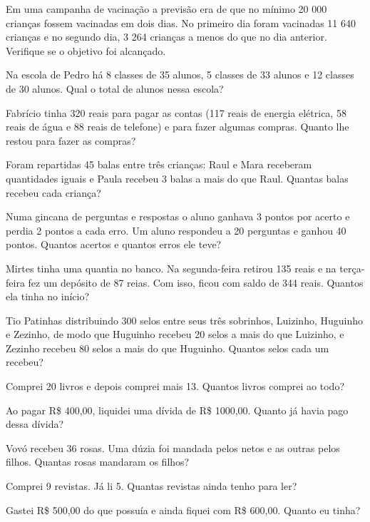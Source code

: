 	\item Em uma campanha de vacinação a previsão era de que no mínimo 20 000 crianças fossem vacinadas em dois dias. No primeiro dia foram vacinadas 11 640 crianças e no segundo dia, 3 264 crianças a menos do que no dia anterior. Verifique se o objetivo foi alcançado.
	\item Na escola de Pedro há 8 classes de 35 alunos, 5 classes de 33 alunos e 12 classes de  30 alunos. Qual o total de alunos nessa escola?
	\item Fabrício tinha 320 reais para pagar as contas (117 reais de energia elétrica, 58 reais de água e 88 reais de telefone) e para fazer algumas compras. Quanto lhe restou para fazer as compras?
	\item Foram repartidas 45 balas entre três crianças: Raul e Mara receberam quantidades iguais e Paula recebeu 3 balas a mais do que Raul. Quantas balas recebeu cada criança?
	\item Numa gincana de perguntas e respostas o aluno ganhava 3 pontos por acerto e perdia 2 pontos a cada erro. Um aluno respondeu a 20 perguntas e ganhou 40 pontos. Quantos acertos e quantos erros ele teve?
	\item Mirtes tinha uma quantia no banco. Na segunda-feira retirou 135 reais e na terça-feira fez um depósito de 87 reias. Com isso, ficou com saldo de 344 reais. Quantos ela tinha no início?
	\item Tio Patinhas distribuindo 300 selos entre seus três sobrinhos, Luizinho, Huguinho e Zezinho, de modo que Huguinho recebeu 20 selos a mais do que Luizinho, e Zezinho recebeu 80 selos a mais do que Huguinho. Quantos selos cada um recebeu?
	
\item Comprei 20 livros e depois comprei mais 13. Quantos livros comprei ao todo?

	\item Ao pagar R\$ 400,00, liquidei uma dívida de R\$ 1000,00. Quanto já havia pago dessa dívida?

	\item Vovó recebeu 36 rosas. Uma dúzia foi mandada pelos netos e as outras pelos filhos. Quantas rosas mandaram os filhos? 

	\item Comprei 9 revistas. Já li 5. Quantas revistas ainda tenho para ler? 

	\item Gastei R\$ 500,00 do que possuía e ainda fiquei com R\$ 600,00. Quanto eu tinha?

